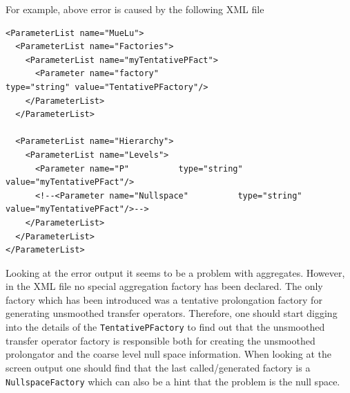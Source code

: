 \documentclass[10pt,fleqn]{book}
\begin{document}
For example, above error is caused by the following XML file

\begin{lstlisting}
<ParameterList name="MueLu">
  <ParameterList name="Factories">
    <ParameterList name="myTentativePFact">
      <Parameter name="factory"                             type="string" value="TentativePFactory"/>
    </ParameterList>
  </ParameterList>

  <ParameterList name="Hierarchy">
    <ParameterList name="Levels">
      <Parameter name="P"          type="string" value="myTentativePFact"/>
      <!--<Parameter name="Nullspace"          type="string" value="myTentativePFact"/>-->
    </ParameterList>
  </ParameterList>
</ParameterList>
\end{lstlisting}


Looking at the error output it seems to be a problem with aggregates. However, in the XML file no special aggregation factory has been declared. The only factory which has been introduced was a tentative prolongation factory for generating unsmoothed transfer operators. Therefore, one should start digging into the details of the \verb|TentativePFactory| to find out that the unsmoothed transfer operator factory is responsible both for creating the unsmoothed prolongator and the coarse level null space information. When looking at the screen output one should find that the last called/generated factory is a \verb|NullspaceFactory| which can also be a hint that the problem is the null space.
\end{document}
